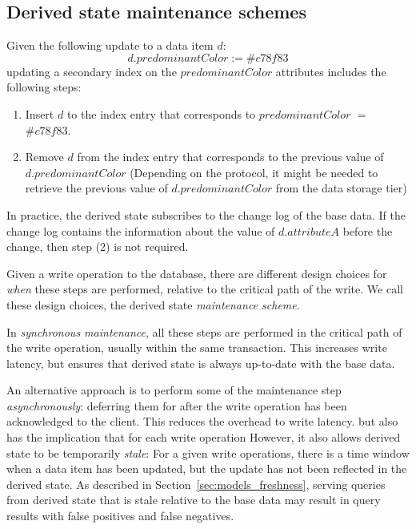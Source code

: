 \subsection{Derived state maintenance schemes}
\label{sec:sync_async_maintenance}


Given the following update to a data item $d$:
\[
d.predominantColor := \#c78f83
\]
updating a secondary index on the $predominantColor$ attributes includes the following steps:
\begin{enumerate}
  \item Insert $d$ to the index entry that corresponds to $predominantColor$ $=$ $\#c78f83$.
  \item Remove $d$ from the index entry that corresponds to the previous value of $d.predominantColor$
  (Depending on the protocol, it might be needed to retrieve the previous value of $d.predominantColor$ from the data storage
  tier)
\end{enumerate}

In practice, the derived state subscribes to the change log of the base data.
If the change log contains the information about the value of $d.attributeA$ before the change, then step (2) is not
required.

Given a write operation to the database,
there are different design choices for \textit{when} these steps are performed, relative to the critical
path of the write.
We call these design choices, the derived state \textit{maintenance scheme}.

In \textit{synchronous maintenance}, all these steps are performed in the critical path of the write operation,
usually within the same transaction.
This increases write latency, but ensures that derived state is always up-to-date with the base data.

An alternative approach is to perform some of the maintenance step \textit{asynchronously}:
deferring them for after the write operation has been acknowledged to the client.
This reduces the overhead to write latency.
but also has the implication that for each write operation
However, it also allows derived state to be temporarily \textit{stale}:
For a given write operations, there is a time window when a data item has been updated,
but the update has not been reflected in the derived state.
As described in Section~\ref{sec:models_freshness},
serving queries from derived state that is stale relative to the base data may result in query results with false positives
and false negatives.

